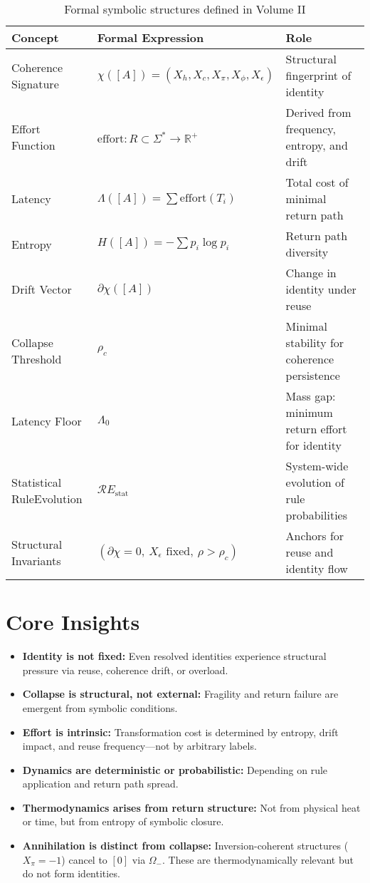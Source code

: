 \begin{table}[h!]
\centering
\begin{tabular}{|l|l|l|}
\hline
\textbf{Concept} & \textbf{Formal Expression} & \textbf{Role} \\
\hline
Coherence Signature & $\chi([A]) = (X_h, X_c, X_\pi, X_\phi, X_\epsilon)$ & Structural fingerprint of identity \\
Effort Function & $\text{effort}: R \subset \Sigma^* \to \mathbb{R}^+$ & Derived from frequency, entropy, and drift \\
Latency & $\Lambda([A]) = \sum \text{effort}(T_i)$ & Total cost of minimal return path \\
Entropy & $H([A]) = -\sum p_i \log p_i$ & Return path diversity \\
Drift Vector & $\partial\chi([A])$ & Change in identity under reuse \\
Collapse Threshold & $\rho_c$ & Minimal stability for coherence persistence \\
Latency Floor & $\Lambda_0$ & Mass gap: minimum return effort for identity \\
Statistical RuleEvolution & $\mathcal{R}E_{\text{stat}}$ & System-wide evolution of rule probabilities \\
Structural Invariants & $(\partial\chi = 0,\ X_\epsilon \text{ fixed},\ \rho > \rho_c)$ & Anchors for reuse and identity flow \\
\hline
\end{tabular}
\caption{Formal symbolic structures defined in Volume II}
\end{table}

\section{Core Insights} \label{core-insights}

\begin{itemize}
    \item \textbf{Identity is not fixed:} Even resolved identities experience structural pressure via reuse, coherence drift, or overload.

    \item \textbf{Collapse is structural, not external:} Fragility and return failure are emergent from symbolic conditions.

    \item \textbf{Effort is intrinsic:} Transformation cost is determined by entropy, drift impact, and reuse frequency—not by arbitrary labels.

    \item \textbf{Dynamics are deterministic or probabilistic:} Depending on rule application and return path spread.

    \item \textbf{Thermodynamics arises from return structure:} Not from physical heat or time, but from entropy of symbolic closure.

    \item \textbf{Annihilation is distinct from collapse:} Inversion-coherent structures ($X_\pi = -1$) cancel to $[0]$ via $\Omega_-$. These are thermodynamically relevant but do not form identities.
\end{itemize}

